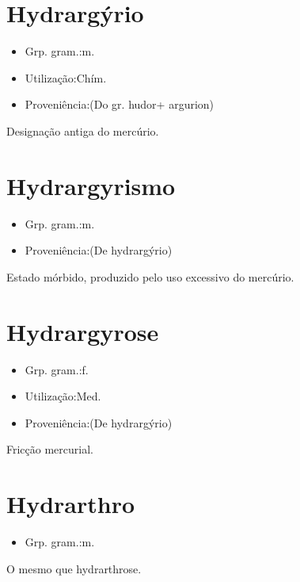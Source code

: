 \documentclass{article}
\begin{document}
\section{Hydrargýrio}
\begin{itemize}
\item {Grp. gram.:m.}
\end{itemize}
\begin{itemize}
\item {Utilização:Chím.}
\end{itemize}
\begin{itemize}
\item {Proveniência:(Do gr. \textunderscore hudor\textunderscore  + \textunderscore argurion\textunderscore )}
\end{itemize}
Designação antiga do mercúrio.
\section{Hydrargyrismo}
\begin{itemize}
\item {Grp. gram.:m.}
\end{itemize}
\begin{itemize}
\item {Proveniência:(De \textunderscore hydrargýrio\textunderscore )}
\end{itemize}
Estado mórbido, produzido pelo uso excessivo do mercúrio.
\section{Hydrargyrose}
\begin{itemize}
\item {Grp. gram.:f.}
\end{itemize}
\begin{itemize}
\item {Utilização:Med.}
\end{itemize}
\begin{itemize}
\item {Proveniência:(De \textunderscore hydrargýrio\textunderscore )}
\end{itemize}
Fricção mercurial.
\section{Hydrarthro}
\begin{itemize}
\item {Grp. gram.:m.}
\end{itemize}
O mesmo que \textunderscore hydrarthrose\textunderscore .
\end{document}
